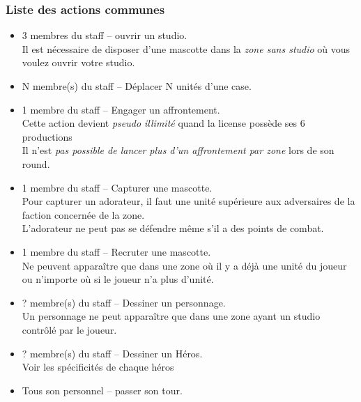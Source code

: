             \subsubsection{Liste des actions communes}

                \begin{itemize}
                    \item 3 membres du staff – ouvrir un studio. \\
                        Il est nécessaire de disposer d'une mascotte dans la \emph{zone sans studio} où vous voulez ouvrir votre studio.
                    \item N membre(s) du staff – Déplacer N unités d'une case.
                    \item 1 membre du staff – Engager un affrontement. \\
                        Cette action devient \textit{pseudo illimité} quand la license possède ses 6 productions \\
                        Il n'est \emph{pas possible de lancer plus d'un affrontement par zone} lors de son round.
                    \item 1 membre du staff – Capturer une mascotte. \\
                        Pour capturer un adorateur, il faut une unité supérieure aux adversaires de la faction concernée de la zone. \\
                        L'adorateur ne peut pas se défendre même s'il a des points de combat.
                    \item 1 membre du staff – Recruter une mascotte. \\
                        Ne peuvent apparaître que dans une zone où il y a déjà une unité du joueur ou
                        n'importe où si le joueur n'a plus d'unité.
                    \item ? membre(s) du staff – Dessiner un personnage. \\
                        Un personnage ne peut apparaître que dans une zone ayant un studio contrôlé par le joueur.
                    \item ? membre(s) du staff – Dessiner un Héros. \\
                        Voir les spécificités de chaque héros
                    \item Tous son personnel – passer son tour.
                \end{itemize}


